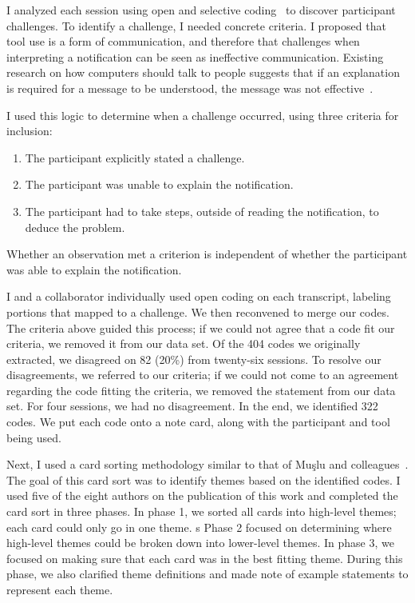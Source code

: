 I analyzed each session using open and selective coding~\cite{corbin2014basics} to discover participant challenges. 
To identify a challenge, I needed concrete criteria. 
I proposed that tool use is a form of communication, and therefore that challenges when interpreting a notification can be seen as ineffective communication.
Existing research on how computers should talk to people suggests that if an explanation is required for a message to be understood, the message was not effective~\cite{dean1982computer}.

I used this logic to determine when a challenge occurred, using three criteria for inclusion: 
\begin{enumerate}
    \item The participant explicitly stated a challenge.
    \item The participant was unable to explain the notification.
    \item The participant had to take steps, outside of reading the notification, to deduce the problem.
\end{enumerate}

Whether an observation met a criterion is independent of whether the participant was able to explain the notification.

I and a collaborator individually used open coding on each transcript, labeling portions that mapped to a challenge. We then reconvened to merge our codes. The criteria above guided this process; if we could not agree that a code fit our criteria, we removed it from our data set. 
Of the 404 codes we originally extracted, we disagreed on 82 (20\%) from twenty-six sessions. 
To resolve our disagreements, we referred to our criteria; if we could not come to an agreement regarding the code fitting the criteria, we removed the statement from our data set. 
For four sessions, we had no disagreement.
In the end, we identified 322 codes. We put each code onto a note card, along with the participant and tool being used. 

Next, I used a card sorting methodology similar to that of Mu\c{s}lu and
colleagues~\cite{Muslu:2014:Transition}. 
The goal of this card sort was to identify themes based on the identified codes.
I used five of the eight authors on the publication of this work and completed the card sort in three phases. In phase 1, we sorted all cards into high-level themes; each card could only go in one theme. s
Phase 2 focused on determining where high-level themes could be broken down into lower-level themes.
In phase 3, we focused on making sure that each card was in the best fitting theme. During this phase, we also clarified theme definitions and made note of example statements to represent each theme.

